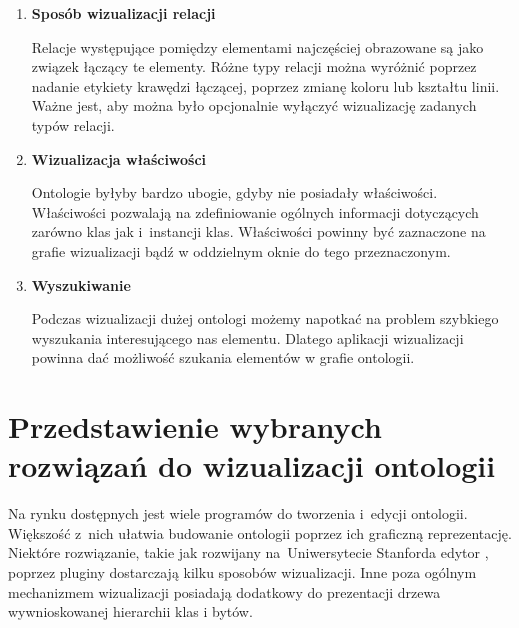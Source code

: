 \begin{enumerate}
\item{\bf Sposób wizualizacji relacji}

\nopagebreak

Relacje występujące pomiędzy elementami najczęściej obrazowane są jako związek łączący te elementy. Różne typy relacji można wyróżnić poprzez nadanie 
etykiety krawędzi łączącej, poprzez zmianę koloru lub kształtu linii. Ważne jest, aby można było opcjonalnie wyłączyć wizualizację zadanych typów
 relacji. 

\item{\bf Wizualizacja właściwości}

\nopagebreak

Ontologie byłyby bardzo ubogie, gdyby nie posiadały właściwości. Właściwości pozwalają na zdefiniowanie ogólnych informacji dotyczących zarówno
 klas jak i~instancji klas. Właściwości powinny być zaznaczone na grafie wizualizacji bądź w oddzielnym oknie do tego przeznaczonym. 

\item{\bf Wyszukiwanie}

\nopagebreak

Podczas wizualizacji dużej ontologi możemy napotkać na problem szybkiego wyszukania interesującego nas elementu. Dlatego aplikacji wizualizacji powinna 
dać możliwość szukania elementów w grafie ontologii.    

\end{enumerate}


\section{Przedstawienie wybranych rozwiązań do wizualizacji ontologii}
Na rynku dostępnych jest wiele programów do tworzenia i~edycji ontologii. Większość z~nich ułatwia budowanie ontologii poprzez ich graficzną reprezentację.
 Niektóre rozwiązanie, takie jak rozwijany na~Uniwersytecie Stanforda edytor \protege , poprzez pluginy dostarczają kilku sposobów wizualizacji. Inne poza
ogólnym mechanizmem wizualizacji posiadają dodatkowy do prezentacji drzewa wywnioskowanej hierarchii klas i bytów.

